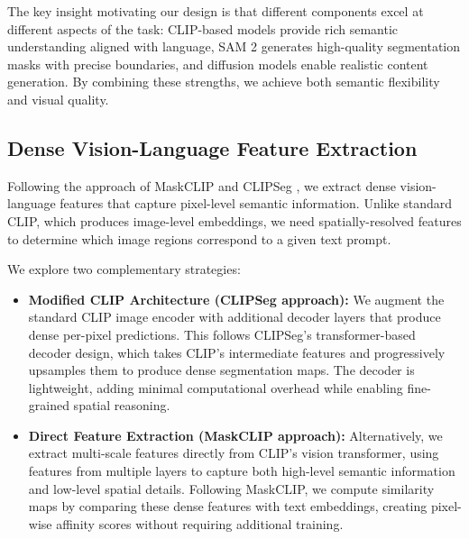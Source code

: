 The key insight motivating our design is that different components excel at different aspects of the task: CLIP-based models \cite{radford2021learning} provide rich semantic understanding aligned with language, SAM 2 \cite{ravi2024sam2} generates high-quality segmentation masks with precise boundaries, and diffusion models \cite{rombach2022high} enable realistic content generation. By combining these strengths, we achieve both semantic flexibility and visual quality.

\subsection{Dense Vision-Language Feature Extraction}
\label{sec:dense_features}

Following the approach of MaskCLIP \cite{zhou2022extract} and CLIPSeg \cite{luddecke2022clipseg}, we extract dense vision-language features that capture pixel-level semantic information. Unlike standard CLIP, which produces image-level embeddings, we need spatially-resolved features to determine which image regions correspond to a given text prompt.

We explore two complementary strategies:

\begin{itemize}
    \item \textbf{Modified CLIP Architecture (CLIPSeg approach):} We augment the standard CLIP image encoder with additional decoder layers that produce dense per-pixel predictions. This follows CLIPSeg's transformer-based decoder design, which takes CLIP's intermediate features and progressively upsamples them to produce dense segmentation maps. The decoder is lightweight, adding minimal computational overhead while enabling fine-grained spatial reasoning.

    \item \textbf{Direct Feature Extraction (MaskCLIP approach):} Alternatively, we extract multi-scale features directly from CLIP's vision transformer, using features from multiple layers to capture both high-level semantic information and low-level spatial details. Following MaskCLIP, we compute similarity maps by comparing these dense features with text embeddings, creating pixel-wise affinity scores without requiring additional training.
\end{itemize}


